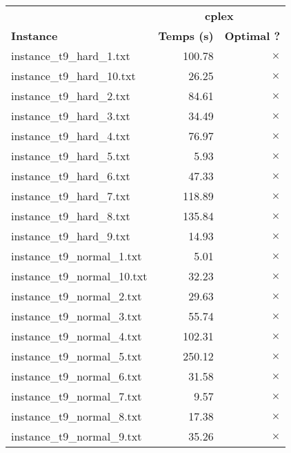 \documentclass{article}
\begin{document}
\newpage
\begin{center}
\renewcommand{\arraystretch}{1.4} 
\begin{tabular}{lrr}
	\hline
 & \multicolumn{2}{c}{\textbf{cplex}}\\
\textbf{Instance}  & \textbf{Temps (s)} & \textbf{Optimal ?} \\\hline

instance\_t9\_hard\_1.txt & 100.78 & 
$\times$
\\
instance\_t9\_hard\_10.txt & 26.25 & 
$\times$
\\
instance\_t9\_hard\_2.txt & 84.61 & 
$\times$
\\
instance\_t9\_hard\_3.txt & 34.49 & 
$\times$
\\
instance\_t9\_hard\_4.txt & 76.97 & 
$\times$
\\
instance\_t9\_hard\_5.txt & 5.93 & 
$\times$
\\
instance\_t9\_hard\_6.txt & 47.33 & 
$\times$
\\
instance\_t9\_hard\_7.txt & 118.89 & 
$\times$
\\
instance\_t9\_hard\_8.txt & 135.84 & 
$\times$
\\
instance\_t9\_hard\_9.txt & 14.93 & 
$\times$
\\
instance\_t9\_normal\_1.txt & 5.01 & 
$\times$
\\
instance\_t9\_normal\_10.txt & 32.23 & 
$\times$
\\
instance\_t9\_normal\_2.txt & 29.63 & 
$\times$
\\
instance\_t9\_normal\_3.txt & 55.74 & 
$\times$
\\
instance\_t9\_normal\_4.txt & 102.31 & 
$\times$
\\
instance\_t9\_normal\_5.txt & 250.12 & 
$\times$
\\
instance\_t9\_normal\_6.txt & 31.58 & 
$\times$
\\
instance\_t9\_normal\_7.txt & 9.57 & 
$\times$
\\
instance\_t9\_normal\_8.txt & 17.38 & 
$\times$
\\
instance\_t9\_normal\_9.txt & 35.26 & 
$\times$
\\
\hline\end{tabular}
\end{center}
\end{document}
